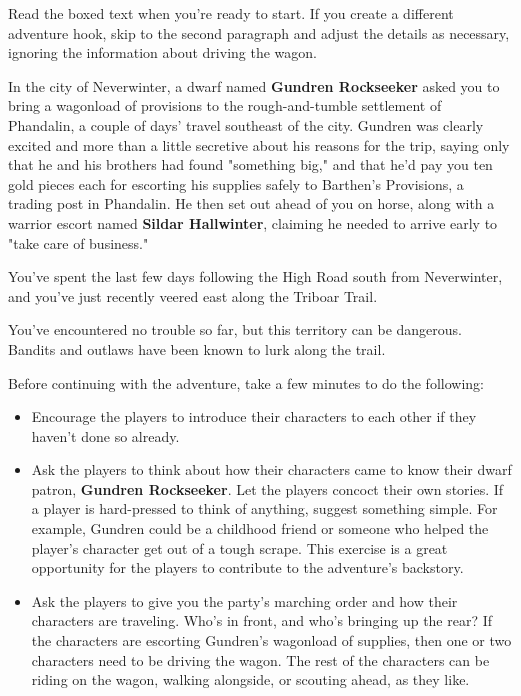 \documentclass[10pt,a4paper,twoside,bg=print,twocolumn,openany,nodeprecatedcode]{dndbook}
\begin{document}
Read the boxed text when you're ready to start. If you create a different adventure hook, skip to the second paragraph and adjust the details as necessary, ignoring the information about driving the wagon.

\begin{DndReadAloud}{}
In the city of Neverwinter, a dwarf named \textbf{Gundren Rockseeker} asked you to bring a wagonload of provisions to the rough-and-tumble settlement of Phandalin, a couple of days' travel southeast of the city. Gundren was clearly excited and more than a little secretive about his reasons for the trip, saying only that he and his brothers had found "something big," and that he'd pay you ten gold pieces each for escorting his supplies safely to Barthen's Provisions, a trading post in Phandalin. He then set out ahead of you on horse, along with a warrior escort named \textbf{Sildar Hallwinter}, claiming he needed to arrive early to "take care of business."

You've spent the last few days following the High Road south from Neverwinter, and you've just recently veered east along the Triboar Trail.

You've encountered no trouble so far, but this territory can be dangerous. Bandits and outlaws have been known to lurk along the trail.

\end{DndReadAloud}

Before continuing with the adventure, take a few minutes to do the following:


\begin{itemize}
\item Encourage the players to introduce their characters to each other if they haven't done so already.
\item Ask the players to think about how their characters came to know their dwarf patron, \textbf{Gundren Rockseeker}. Let the players concoct their own stories. If a player is hard-pressed to think of anything, suggest something simple. For example, Gundren could be a childhood friend or someone who helped the player's character get out of a tough scrape. This exercise is a great opportunity for the players to contribute to the adventure's backstory.
\item Ask the players to give you the party's marching order and how their characters are traveling. Who's in front, and who's bringing up the rear? If the characters are escorting Gundren's wagonload of supplies, then one or two characters need to be driving the wagon. The rest of the characters can be riding on the wagon, walking alongside, or scouting ahead, as they like.
\end{itemize}
\end{document}
